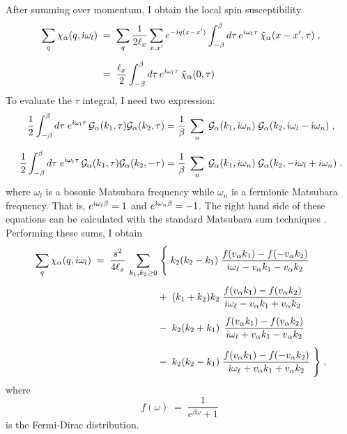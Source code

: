 After summing over momentum, I obtain the local spin susceptibility 
\begin{align}
    \sum_{q}  \chi_{\alpha}(q, \dot{\imath} \omega_l ) \; &= \; \sum_{q} \frac{1}{2 \ell_x} \sum_{x,x'} e^{- \dot{\imath} q (x-x^{ \prime} )}  \int_{-\beta}^{\beta} d\tau  \, e^{\dot{\imath} \omega_l \tau }  \, \tilde{\chi}_{\alpha}(x-x', \tau ) \; , \\[6pt]
    & = \; \frac{\ell_x}{2} \int_{-\beta}^{\beta} d\tau  \, e^{\dot{\imath} \omega_l \tau } \,  \tilde{\chi}_{\alpha}(0, \tau )
\end{align}
To evaluate the $\tau$ integral, I need two expression:
\begin{align}
    \frac{1}{2} \int_{-\beta}^{\beta} d \tau  \; e^{\dot{\imath} \omega_l \tau } \, \mathcal{G}_{\alpha}(k_1 , \tau ) \mathcal{G}_{\alpha}( k_2 , \tau ) 
     & =  \frac{1}{\beta}  \;  \sum_{n } \; \mathcal{G}_{\alpha}(k_1 , \dot{\imath} \omega_{n} )\; \mathcal{G}_{\alpha}(k_2 , \dot{\imath} \omega_{l} -\dot{\imath} \omega_{n} ) \; , \\[6pt]
    \frac{1}{2} \int_{-\beta}^{\beta} d \tau  \; e^{\dot{\imath} \omega_l \tau } \, \mathcal{G}_{\alpha}(k_1, \tau ) \mathcal{G}_{\alpha}(k_2 , -\tau ) 
     & = \frac{1}{\beta}  \;  \sum_{n } \; \mathcal{G}_{\alpha}(k_1 , \dot{\imath} \omega_{n} )\; \mathcal{G}_{\alpha}(k_2 , -\dot{\imath} \omega_{l} +\dot{\imath} \omega_{n}  ) \; .
\end{align}
where $\omega_l$ is a bosonic Matsubara frequency while $\omega_n$ is a fermionic Matsubara frequency. That is, $e^{\dot{\imath} \omega_l \beta} = 1 $ and $e^{\dot{\imath} \omega_{n} \beta} = - 1 $. The right hand side of these equations can be calculated with the standard Matsubara sum techniques \cite{altland2010condensed, mahan2000many}. Performing these sums, I obtain 
\begin{equation}
    \begin{split}
     \sum_{q} \chi_{\alpha}(q, \dot{\imath} \omega_l ) \;  = \;  \frac{s^2}{4 \ell_x} \,  \sum_{k_{1},k_{2} \geq 0} & \;   \Bigg\{  \;   k_{2}(k_{2}-k_{1})  \;   \frac{ f(  v_{ \alpha } k_{1} ) - f( - v_{ \alpha } k_{2} )  }{\dot{\imath} \omega_{ \ell  }  -v_{ \alpha } k_{1} - v_{ \alpha } k_{2} } 
        \\[5pt]   & +  \; (k_{1}+k_{2})k_{2}  \;   \frac{ f(  v_{ \alpha } k_{1} ) - f(  v_{ \alpha } k_{2} )  }{\dot{\imath} \omega_{ \ell  } - v_{ \alpha } k_{1}+  v_{ \alpha } k_{2}} \;        \\[5pt]
        &  -  \;   k_{2}(k_{2}+k_{1}) \;   \, \frac{ f( v_{ \alpha } k_{1}) - f(  v_{ \alpha } k_{2} )}{\dot{\imath} \omega_{ \ell  }  + v_{ \alpha } k_{1}- v_{ \alpha } k_{2}} \;  \\[5pt] & - \;    k_{2}(k_{2}-k_{1}) \; \frac{ f( v_{ \alpha } k_{1} ) - f( -  v_{ \alpha } k_{2} )  }{\dot{\imath} \omega_{ \ell  } + v_{ \alpha } k_{1}+  v_{ \alpha } k_{2} }  \;  \Bigg\} \; , 
    \end{split} 
\end{equation}
where 
\begin{equation}
    f(\omega) \; = \; \frac{1}{e^{\beta \omega} +1} \; 
\end{equation}
is the Fermi-Dirac distribution.


